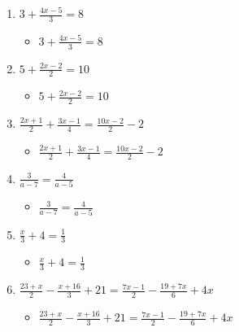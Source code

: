 \documentclass{article}
\begin{document}
\begin{enumerate}
\item {\Large $3+\frac{4x-5}{3}=8$}
  \begin{itemize}
  \item {\Large $3+\frac{4x-5}{3}=8$}
  \end{itemize}
\item {\Large $5+\frac{2x-2}{2}=10$}
  \begin{itemize}
  \item {\Large $5+\frac{2x-2}{2}=10$}
  \end{itemize}
\item {\Large $\frac{2x+1}{2}+\frac{3x-1}{4}=\frac{10x-2}{2}-2$}
  \begin{itemize}
  \item {\Large $\frac{2x+1}{2}+\frac{3x-1}{4}=\frac{10x-2}{2}-2$}
  \end{itemize}
\item {\Large $\frac{3}{a-7}=\frac{4}{a-5}$}
  \begin{itemize}
  \item {\Large $\frac{3}{a-7}=\frac{4}{a-5}$}
  \end{itemize}
\item {\Large $\frac{x}{3}+4=\frac{1}{3}$}
  \begin{itemize}
  \item {\Large $\frac{x}{3}+4=\frac{1}{3}$}
  \end{itemize}
\item {\Large $\frac{23+x}{2}-\frac{x+16}{3}+21=\frac{7x-1}{2}-\frac{19+7x}{6}+4x$}
  \begin{itemize}
  \item {\Large $\frac{23+x}{2}-\frac{x+16}{3}+21=\frac{7x-1}{2}-\frac{19+7x}{6}+4x$}
  \end{itemize}
\end{enumerate}

\newpage
\end{document}
